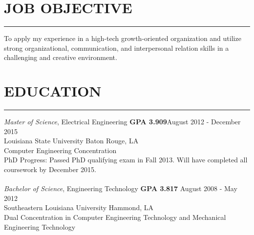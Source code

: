 \documentclass{res}
\begin{document}
 


\address{\bf  PRESENT ADDRESS\\Southlake Avenue\\Baton Rouge, LA 70804}
\address{\bf PERMANENT ADDRESS \\Smith Drive\\  Walker , LA 70785}
                                  
\begin{resume}

\section{JOB OBJECTIVE}
	\rule{\textwidth}{0.5pt}
    To apply my experience in a high-tech growth-oriented organization and utilize strong organizational, communication, and interpersonal relation skills in a challenging and creative environment.      
    
\section{EDUCATION}
	\rule{\textwidth}{0.5pt}
	\vspace{8pt} 
	{\sl Master of Science}, Electrical Engineering {\bf GPA 3.909}\hfill August 2012 - December 2015\\ 
	Louisiana State University \hfill Baton Rouge, LA\\   
	{\footnotesize Computer Engineering Concentration\\
	PhD Progress: Passed PhD qualifying exam in Fall 2013. Will have completed all coursework by December 2015.}\\\\
	{\sl Bachelor of Science}, Engineering Technology {\bf GPA 3.817} \hfill August 2008 - May 2012\\
	Southeastern Louisiana University \hfill Hammond, LA\\
	{\footnotesize Dual Concentration in Computer Engineering Technology and Mechanical Engineering Technology}\\

\end{resume}
\end{document}
